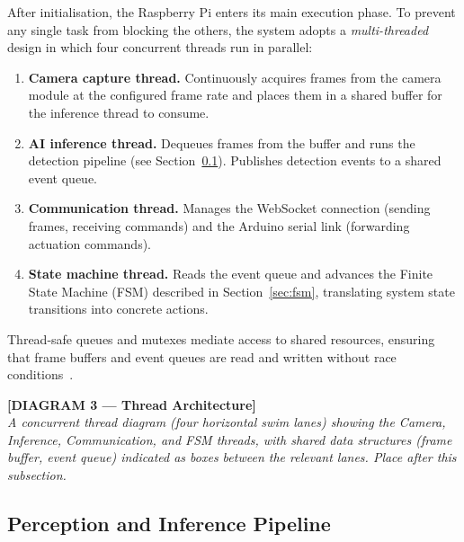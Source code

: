 After initialisation, the Raspberry Pi enters its main execution
phase. To prevent any single task from blocking the others, the
system adopts a \emph{multi-threaded} design in which four concurrent
threads run in parallel:
 
\begin{enumerate}
    \item \textbf{Camera capture thread.} Continuously acquires frames
          from the camera module at the configured frame rate and
          places them in a shared buffer for the inference thread to
          consume.
 
    \item \textbf{AI inference thread.} Dequeues frames from the
          buffer and runs the detection pipeline (see
          Section~\ref{sec:inference_pipeline}). Publishes detection
          events to a shared event queue.
 
    \item \textbf{Communication thread.} Manages the WebSocket
          connection (sending frames, receiving commands) and the
          Arduino serial link (forwarding actuation commands).
 
    \item \textbf{State machine thread.} Reads the event queue and
          advances the Finite State Machine (FSM) described in
          Section~\ref{sec:fsm}, translating system state transitions
          into concrete actions.
\end{enumerate}
 
Thread-safe queues and mutexes mediate access to shared resources,
ensuring that frame buffers and event queues are read and written
without race conditions~\cite{silberschatz2018os}.
 
\bigskip
\noindent\textbf{[DIAGRAM 3 — Thread Architecture]}\\
\textit{A concurrent thread diagram (four horizontal swim lanes)
showing the Camera, Inference, Communication, and FSM threads,
with shared data structures (frame buffer, event queue) indicated
as boxes between the relevant lanes. Place after this subsection.}
\bigskip
 
\subsection{Perception and Inference Pipeline}
\label{sec:inference_pipeline}
 
